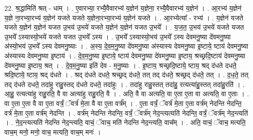 \documentclass[17pt]{extarticle}
\begin{document}
22. श्र॒द्धामिति॑ श्रत् - धाम् । . ए॒वारभ्या॒ रभ्यै॒वैवारभ्य॑ य॒ज्ञेन॑ य॒ज्ञेना॒ रभ्यै॒वैवारभ्य॑ य॒ज्ञेन॑ । . आ॒रभ्य॑ य॒ज्ञेन॑ य॒ज्ञे ना॒रभ्या॒रभ्य॑ य॒ज्ञेन॑ यजते यजते य॒ज्ञेना॒रभ्या॒रभ्य॑ य॒ज्ञेन॑ यजते । . आ॒रभ्येत्या᳚ - रभ्य॑ । . य॒ज्ञेन॑ यजते यजते य॒ज्ञेन॑ य॒ज्ञेन॑ यजत उ॒भय॑ उ॒भये॑ यजते य॒ज्ञेन॑ य॒ज्ञेन॑ यजत उ॒भये᳚ । . य॒ज॒त॒ उ॒भय॑ उ॒भये॑ यजते यजत उ॒भये᳚ ऽस्यास्यो॒भये॑ यजते यजत उ॒भये᳚ ऽस्य । . उ॒भये᳚ ऽस्यास्यो॒भय॑ उ॒भये᳚ ऽस्य देवमनु॒ष्या दे॑वमनु॒ष्या अ॑स्यो॒भय॑ उ॒भये᳚ ऽस्य देवमनु॒ष्याः । . अ॒स्य॒ दे॒व॒म॒नु॒ष्या दे॑वमनु॒ष्या अ॑स्यास्य देवमनु॒ष्या इ॒ष्टाये॒ ष्टाय॑ देवमनु॒ष्या अ॑स्यास्य देवमनु॒ष्या इ॒ष्टाय॑ । . दे॒व॒म॒नु॒ष्या इ॒ष्टाये॒ ष्टाय॑ देवमनु॒ष्या दे॑वमनु॒ष्या इ॒ष्टाय॒ श्रच्छ्रदि॒ष्टाय॑ देवमनु॒ष्या दे॑वमनु॒ष्या इ॒ष्टाय॒ श्रत् । . दे॒व॒म॒नु॒ष्या इति॑ देव - म॒नु॒ष्याः । . इ॒ष्टाय॒ श्रच्छ्रदि॒ष्टाये॒ ष्टाय॒ श्रद् द॑धते दधते॒ श्रदि॒ष्टाये॒ ष्टाय॒ श्रद् द॑धते । . श्रद् द॑धते दधते॒ श्रच्छ्रद् द॑धते॒ तत् तद् द॑धते॒ श्रच्छ्रद् द॑धते॒ तत् । . द॒ध॒ते॒ तत् तद् द॑धते दधते॒ तदा॑हु राहु॒स्तद् द॑धते दधते॒ तदा॑हुः । . तदा॑हु राहु॒स्तत् तदा॑हु॒ रत्यत्या॑हु॒स्तत् तदा॑हु॒रति॑ । . आ॒हु॒ रत्यत्या॑हु राहु॒रति॒ वै वा अत्या॑हु राहु॒रति॒ वै । . अति॒ वै वा अत्यति॒ वा ए॒ता ए॒ता वा अत्यति॒ वा ए॒ताः । . वा ए॒ता ए॒ता वै वा ए॒ता वर्त्रं॒ ॅवर्त्र॑ मे॒ता वै वा ए॒ता वर्त्र᳚म् । . ए॒ता वर्त्रं॒ ॅवर्त्र॑ मे॒ता ए॒ता वर्त्र॑म् नेदन्ति नेदन्ति॒ वर्त्र॑ मे॒ता ए॒ता वर्त्र॑म् नेदन्ति । . वर्त्र॑म् नेदन्ति नेदन्ति॒ वर्त्रं॒ ॅवर्त्र॑म् नेद॒न्त्यत्यति॑ नेदन्ति॒ वर्त्रं॒ ॅवर्त्र॑म् नेद॒न्त्यति॑ । . ने॒द॒न्त्यत्यति॑ नेदन्ति नेद॒न्त्यति॒ वाचं॒ ॅवाच॒ मति॑ नेदन्ति नेद॒न्त्यति॒ वाच᳚म् । . अति॒ वाचं॒ ॅवाच॒ मत्यति॒ वाच॒म् मनो॒ मनो॒ वाच॒ मत्यति॒ वाच॒म् मनः॑ । \newline
\end{document}
